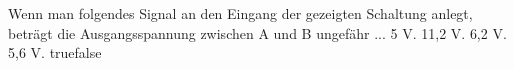     {Wenn man folgendes Signal an den Eingang der gezeigten Schaltung anlegt, beträgt die Ausgangsspannung zwischen A und B ungefähr ...}
    {5 V.}
    {11,2 V.}
    {6,2 V.}
    {5,6 V.}
    {true}{false}